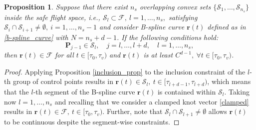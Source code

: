 \documentclass[journal,10pt]{IEEEtran}
\newtheorem{proposition}{\bfseries Proposition}%
\newcommand{\vect}[1]{\boldsymbol{\mathbf{#1}}}
\newif\ifdraft
\newcommand{\XX}[1]{\ifdraft{\color{red}[{\bf XX}: #1]}\fi}
\begin{document}
\begin{proposition} \label{convex_sets_prop}
Suppose that there exist $n_s$ overlapping convex sets $\{\mathcal{S}_1,\ldots,\mathcal{S}_{n_s}\}$ inside the safe flight space, i.e., $\mathcal{S}_l\subset \mathcal{F},\ l=1,\ldots,n_s,$ satisfying $\mathcal{S}_i\cap \mathcal{S}_{i+1}\neq \emptyset, \ i = 1,\ldots,n_s-1$ and consider B-spline curve $\vect{r}(t)$ defined as in \eqref{b-spline_curve} with $N=n_s+d-1$. If the following conditions hold:
\begin{equation}\label{eqobstc}
    \vect{P}_{j-1} \in \mathcal{S}_{l},\quad j = l,\ldots,l+d, \quad l = 1,\ldots,n_s,
\end{equation}
then  $\vect{r}(t)\in\mathcal{F}$  for all $t\in[\tau_0,\tau_v)$ and $\vect{r}(t)$ is at least $C^{d-1},\  \forall t\in[\tau_0,\tau_v)$.
\end{proposition}
\begin{proof} Applying Proposition \ref{inclusion_prop} to the inclusion constraint of the $l$-th  group of control points results in $\vect{r}(t)\in \mathcal{S}_l, \ t\in[\tau_{l+d-1},\tau_{l+d})$, which means that the $l$-th segment of the B-spline curve $\vect{r}(t)$ is contained within $\mathcal{S}_l$. Taking now $l=1,\ldots,n_s$ and recalling that we consider a clamped knot vector \eqref{clamped} results in $\vect{r}(t)\in\mathcal{F},\ t\in[\tau_0,\tau_v)$. Further, note that $\mathcal{S}_l\cap \mathcal{S}_{l+1} \neq \emptyset$ allows $\vect{r}(t)$ to be continuous despite the segment-wise constraints. 
\end{proof}
\end{document}
